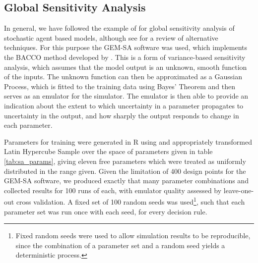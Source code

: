 \subsection{Global Sensitivity Analysis}
\label{sub:sensitivity}

In general, we have followed the example of \cite{Bijak2013b} for global sensitivity analysis of stochastic agent based models, although see \citet{Thiele2014} for a review of alternative techniques. For this purpose the \ac{GEM-SA} software \citep{Kennedy} was used, which implements the \ac{BACCO} method developed by \citeauthor{Oakley2004} \citep{Oakley2002,Oakley2004,Dorresteijn2010}. This is a form of variance-based sensitivity analysis, which assumes that the model output is an unknown, smooth function of the inputs. The unknown function can then be approximated as a Gaussian Process, which is fitted to the training data using Bayes' Theorem and then serves as an emulator for the simulator. The emulator is then able to provide an indication about the extent to which uncertainty in a parameter propagates to uncertainty in the output, and how sharply the output responds to change in each parameter.

\begin{comment}

Justification for doing SA, point out the wide variety of places this gets used. Talk about uncertainty, briefly raise model discrepancy.

\end{comment}

Parameters for training were generated in R \citep{RTeam2014} using and appropriately transformed Latin Hypercube Sample \citep{Carnell2012} over the space of parameters given in table \ref{tab:sa_params}, giving eleven free parameters which were treated as uniformly distributed in the range given.  Given the limitation of 400 design points for the \ac{GEM-SA} software, we produced exactly that many parameter combinations and collected results for 100 runs of each, with emulator quality assessed by leave-one-out cross validation. A fixed set of 100 random seeds was used\footnote{Fixed random seeds were used to allow simulation results to be reproducible, since the combination of a parameter set and a random seed yields a deterministic process.}, such that each parameter set was run once with each seed, for every decision rule.


